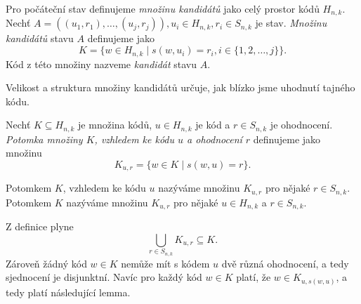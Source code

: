 \begin{definice}\label{kandidat}
  Pro počáteční stav definujeme \emph{množinu kandidátů} jako celý prostor kódů $H_{n,k}$. Nechť $A = \left((u_1, r_1), \dots, (u_j,r_j)\right), u_i \in H_{n,k}, r_i \in S_{n,k}$ je stav. \emph{Množinu kandidátů} stavu $A$ definujeme jako
  \[K = \{w \in H_{n,k} \mid s(w,u_i) = r_i,  i \in \{1,2,\dots ,j\} \}.\]
  Kód z této množiny nazveme \emph{kandidát} stavu $A$. 
  

\end{definice}
Velikost a struktura množiny kandidátů určuje, jak blízko jsme uhodnutí tajného kódu.
\begin{definice}\label{defpotomekmnoziny}
  Nechť $K \subseteq H_{n,k}$ je množina kódů, $u \in H_{n,k}$ je kód a $r \in S_{n,k}$ je ohodnocení. \emph{Potomka množiny $K$, vzhledem ke kódu $u$ a ohodnocení $r$} definujeme jako množinu 
  \[K_{u,r} = \{w \in K \mid s(w,u) = r\}.\] 
\end{definice}
\begin{pozn}
    Potomkem $K$, vzhledem ke kódu $u$ nazýváme množinu $K_{u,r}$ pro nějaké $r \in S_{n,k}$. Potomkem $K$ nazýváme množinu $K_{u,r}$ pro nějaké $u\in H_{n,k}$ a $r \in S_{n,k}$. 
\end{pozn}
Z definice plyne
\[\bigcup_{r\in S_{n,k}} K_{u,r} \subseteq K.\] Zároveň žádný kód $w \in K$ nemůže mít s kódem $u$ dvě různá ohodnocení, a tedy sjednocení je disjunktní. Navíc pro každý kód $w \in K$ platí, že $w \in K_{u, s(w,u)}$, a tedy platí následující lemma.

